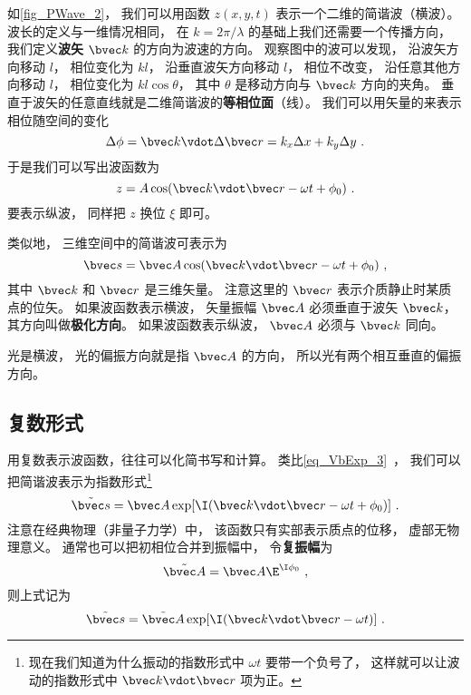 如\autoref{fig_PWave_2}， 我们可以用函数 $z(x,y,t)$ 表示一个二维的简谐波（横波）。 波长的定义与一维情况相同， 在 $k = 2\pi/\lambda$ 的基础上我们还需要一个传播方向， 我们定义\textbf{波矢} $\bvec k$ 的方向为波速的方向。
观察图中的波可以发现， 沿波矢方向移动 $l$， 相位变化为 $kl$， 沿垂直波矢方向移动 $l$， 相位不改变， 沿任意其他方向移动 $l$， 相位变化为 $kl\cos\theta$， 其中 $\theta$ 是移动方向与 $\bvec k$ 方向的夹角。 垂直于波矢的任意直线就是二维简谐波的\textbf{等相位面}（线）。 我们可以用矢量的来表示相位随空间的变化
\begin{equation}
\Delta\phi = \bvec k \vdot \Delta\bvec r = k_x \Delta x + k_y \Delta y~.
\end{equation}
于是我们可以写出波函数为
\begin{equation}\label{eq_PWave_8}
z = A \cos(\bvec k \vdot \bvec r - \omega t + \phi_0)~.
\end{equation}
要表示纵波， 同样把 $z$ 换位 $\xi$ 即可。

类似地， 三维空间中的简谐波可表示为
\begin{equation}
\bvec s = \bvec A \cos(\bvec k \vdot \bvec r - \omega t + \phi_0)~,
\end{equation}
其中 $\bvec k$ 和 $\bvec r$ 是三维矢量。 注意这里的 $\bvec r$ 表示介质静止时某质点的位矢。 如果波函数表示横波， 矢量振幅 $\bvec A$ 必须垂直于波矢 $\bvec k$， 其方向叫做\textbf{极化方向}。 如果波函数表示纵波， $\bvec A$ 必须与 $\bvec k$ 同向。

光是横波， 光的偏振方向就是指 $\bvec A$ 的方向， 所以光有两个相互垂直的偏振方向。

\subsection{复数形式}\label{sub_PWave_2}

用复数表示波函数，往往可以化简书写和计算。 类比\autoref{eq_VbExp_3}~， 我们可以把简谐波表示为指数形式\footnote{现在我们知道为什么振动的指数形式中 $\omega t$ 要带一个负号了， 这样就可以让波动的指数形式中 $\bvec k\vdot \bvec r$ 项为正。}
\begin{equation}
\tilde {\bvec s} = \bvec A \exp[\I( \bvec k \vdot \bvec r - \omega t + \phi_0)]~.
\end{equation}
注意在经典物理（非量子力学）中， 该函数只有实部表示质点的位移， 虚部无物理意义。 通常也可以把初相位合并到振幅中， 令\textbf{复振幅}为
\begin{equation}
\tilde {\bvec A} = \bvec A \E^{\I \phi_0}~,
\end{equation}
则上式记为
\begin{equation}
\tilde {\bvec s} = \tilde {\bvec A} \exp[\I( \bvec k \vdot \bvec r - \omega t)]~.
\end{equation}

